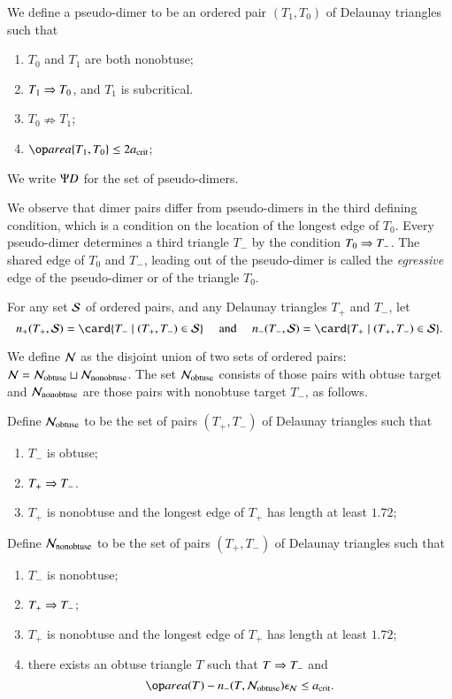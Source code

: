 \begin{definition}
  We define a pseudo-dimer to be an ordered pair $(T_1,T_0)$ of
  Delaunay triangles such that
\begin{enumerate}
\item $T_0$ and $T_1$ are both nonobtuse;
\item $T_1\Ra T_0$, and  $T_1$ is subcritical.
\item $T_0 \nRightarrow T_1$;
\item $\area\{T_1,T_0\} \le 2\acrit$;
\end{enumerate}
We write $\PD$ for the set of pseudo-dimers.
\end{definition}

We observe that dimer pairs differ from pseudo-dimers in the third
defining condition, which is a condition on the location of the
longest edge of $T_0$.  Every pseudo-dimer determines a third triangle
$T_-$ by the condition $T_0\Ra T_-$.  The shared edge of $T_0$ and
$T_-$, leading out of the pseudo-dimer is called the {\it egressive} edge of
the pseudo-dimer or of the triangle $T_0$.

For any set $\S$ of ordered pairs, and any Delaunay triangles $T_+$
and $T_-$, let
\[
n_+(T_+,\S) = \card \{T_-\mid (T_+,T_-)\in \S\}
\quad\text{ and }\quad
n_-(T_-,\S)
= \card \{T_+\mid (T_+,T_-)\in \S\}.
\]

We define $\N$ as the disjoint union of two sets of ordered pairs: $\N
= \N_{\text{obtuse}} \sqcup \N_{\text{nonobtuse}}$.  The set
$\N_{\text{obtuse}}$ consists of those pairs with obtuse target and
$\N_{\text{nonobtuse}}$ are those pairs with nonobtuse target $T_-$,
as follows.

Define $\N_{\text{obtuse}}$ to be the set of pairs $(T_+,T_-)$ of
Delaunay triangles such that
\begin{enumerate}
\item $T_-$ is obtuse;
\item $T_+\Ra T_-$.
\item $T_+$ is nonobtuse and the longest edge of $T_+$ has length at
  least $1.72$;
\end{enumerate}

Define  $\N_{\text{nonobtuse}}$ to 
be the set of pairs $(T_+,T_-)$ of Delaunay triangles such that
\begin{enumerate}
\item $T_-$ is nonobtuse;
\item $T_+\Ra T_-$;
\item $T_+$ is nonobtuse and the longest edge of $T_+$ has length at
  least $1.72$;
\item there exists an obtuse triangle $T$ such that $T\Ra T_-$ and 
\[
\area(T) -   n_-(T,\N_{\text{obtuse}})\epsN\le \acrit.
\]
\end{enumerate}

